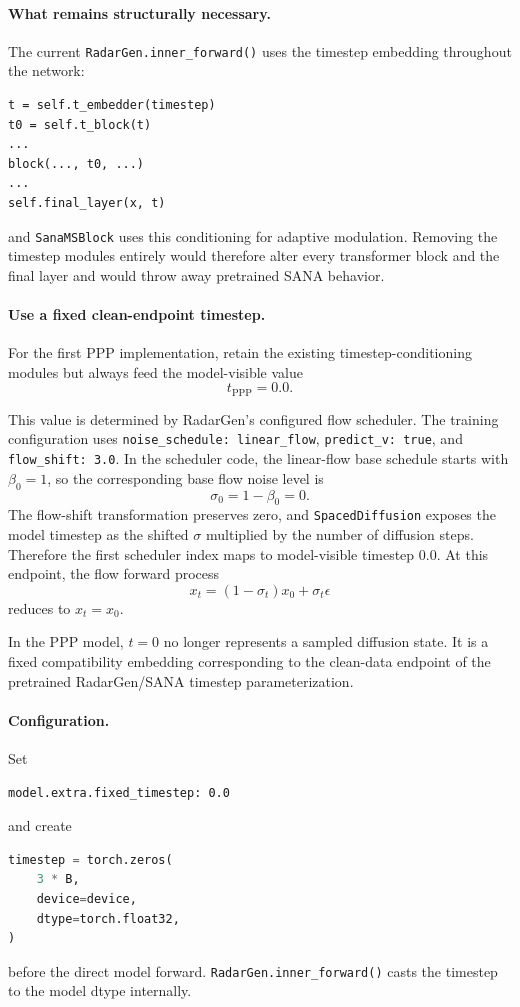 \documentclass[11pt,a4paper]{article}
\begin{document}
\paragraph{What remains structurally necessary.}
The current \texttt{RadarGen.inner\_forward()} uses the timestep embedding throughout the network:
\begin{lstlisting}
t = self.t_embedder(timestep)
t0 = self.t_block(t)
...
block(..., t0, ...)
...
self.final_layer(x, t)
\end{lstlisting}
and \texttt{SanaMSBlock} uses this conditioning for adaptive modulation. Removing the timestep modules entirely would therefore alter every transformer block and the final layer and would throw away pretrained SANA behavior.

\paragraph{Use a fixed clean-endpoint timestep.}
For the first PPP implementation, retain the existing timestep-conditioning modules but always feed the model-visible value
\[
    t_{\mathrm{PPP}}=0.0.
\]

This value is determined by RadarGen's configured flow scheduler. The training configuration uses \texttt{noise\_schedule: linear\_flow}, \texttt{predict\_v: true}, and \texttt{flow\_shift: 3.0}. In the scheduler code, the linear-flow base schedule starts with \(\beta_0=1\), so the corresponding base flow noise level is
\[
    \sigma_0=1-\beta_0=0.
\]
The flow-shift transformation preserves zero, and \texttt{SpacedDiffusion} exposes the model timestep as the shifted \(\sigma\) multiplied by the number of diffusion steps. Therefore the first scheduler index maps to model-visible timestep \(0.0\). At this endpoint, the flow forward process
\[
    x_t=(1-\sigma_t)x_0+\sigma_t\epsilon
\]
reduces to \(x_t=x_0\).

In the PPP model, \(t=0\) no longer represents a sampled diffusion state. It is a fixed compatibility embedding corresponding to the clean-data endpoint of the pretrained RadarGen/SANA timestep parameterization.

\paragraph{Configuration.}
Set
\begin{lstlisting}
model.extra.fixed_timestep: 0.0
\end{lstlisting}
and create
\begin{lstlisting}[language=Python]
timestep = torch.zeros(
    3 * B,
    device=device,
    dtype=torch.float32,
)
\end{lstlisting}
before the direct model forward. \texttt{RadarGen.inner\_forward()} casts the timestep to the model dtype internally.
\end{document}
